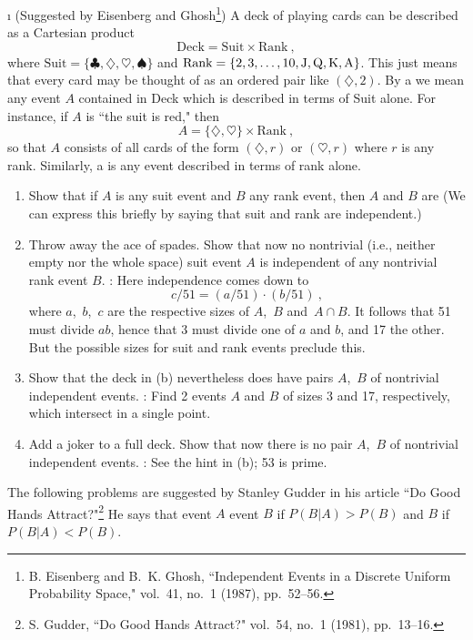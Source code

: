 \begin{LJSItem}
\i\label{exer 4.1.38} (Suggested by Eisenberg and Ghosh\footnote{B. Eisenberg and B.~K. Ghosh, ``Independent Events in a Discrete
Uniform Probability Space,"  vol.~41, no.~1 (1987),
pp.~52--56.})  A deck of playing cards can be described as a Cartesian product
$$
\mbox{Deck} =  \mbox{Suit} \times \mbox{Rank}\ ,
$$
where $\mbox{Suit} = \{\clubsuit,\diamondsuit,\heartsuit,\spadesuit\}$ and %
$\mbox{Rank} = \{2,3,\dots,10,{\mbox J},{\mbox Q},{\mbox K},{\mbox A}\}$.  This
just means that every card may be thought of as an ordered pair like
$(\diamondsuit,2)$.  By a  we mean any event $A$ contained in
Deck which is described in terms of Suit alone.  For instance, if $A$ is ``the
suit is red," then
$$
A = \{\diamondsuit,\heartsuit\} \times \mbox{Rank}\ ,
$$
so that $A$ consists of all cards of the form $(\diamondsuit,r)$ or
$(\heartsuit,r)$ where $r$ is any rank.  Similarly, a  is any
event described in terms of rank alone.
\begin{enumerate}
\item Show that if $A$ is any suit event and $B$ any rank event, then $A$
and $B$ are   (We can express this briefly by saying that
suit and rank are independent.)

\item Throw away the ace of spades.  Show that now no nontrivial (i.e.,
neither empty nor the whole space) suit event $A$ is independent of any
nontrivial rank event $B$.  : Here independence comes down to
$$
c/51 = (a/51) \cdot (b/51)\ ,
$$
where $a$,~$b$,~$c$ are the respective sizes of $A$,~$B$ and~$A \cap B$.  It
follows that 51 must divide $ab$, hence that 3 must divide one of $a$ and $b$,
and 17 the other.  But the possible sizes for suit and rank events preclude
this.

\item Show that the deck in (b) nevertheless does have
pairs $A$,~$B$ of nontrivial independent events.  : Find 2 events
$A$ and $B$ of sizes 3 and 17, respectively, which intersect in a single point.

\item Add a joker to a full deck.  Show that now there is no pair $A$,~$B$
of nontrivial independent events.  : See the hint in
(b); 53 is prime.
\end{enumerate}
\par
\medskip
\noindent
The following problems are suggested by Stanley Gudder in his article
``Do Good Hands Attract?"\footnote{S. Gudder, ``Do Good Hands Attract?"  vol.~54, no.~1 (1981), pp.~13--16.}  He says that
event $A$  event $B$ if $P(B|A) > P(B)$ and 
$B$ if $P(B|A) < P(B)$.


\end{LJSItem}
